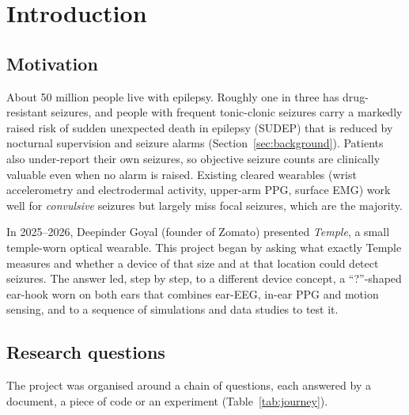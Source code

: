 \section{Introduction}
\label{sec:intro}

\subsection{Motivation}

About 50 million people live with epilepsy. Roughly one in three has drug-resistant seizures, and people with frequent tonic-clonic seizures carry a markedly raised risk of sudden unexpected death in epilepsy (SUDEP) that is reduced by nocturnal supervision and seizure alarms (Section~\ref{sec:background}). Patients also under-report their own seizures, so objective seizure counts are clinically valuable even when no alarm is raised. Existing cleared wearables (wrist accelerometry and electrodermal activity, upper-arm PPG, surface EMG) work well for \emph{convulsive} seizures but largely miss focal seizures, which are the majority.

In 2025--2026, Deepinder Goyal (founder of Zomato) presented \emph{Temple}, a small temple-worn optical wearable. This project began by asking what exactly Temple measures and whether a device of that size and at that location could detect seizures. The answer led, step by step, to a different device concept, a ``?''-shaped ear-hook worn on both ears that combines ear-EEG, in-ear PPG and motion sensing, and to a sequence of simulations and data studies to test it.

\subsection{Research questions}

The project was organised around a chain of questions, each answered by a document, a piece of code or an experiment (Table~\ref{tab:journey}).

